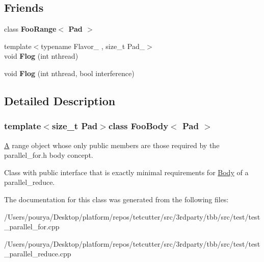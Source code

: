 \subsection*{Friends}
\begin{DoxyCompactItemize}
\item 
\hypertarget{classFooBody_a249f90cfce963ebba6c1d3ef0859364a}{}class {\bfseries Foo\+Range$<$ Pad $>$}\label{classFooBody_a249f90cfce963ebba6c1d3ef0859364a}

\item 
\hypertarget{classFooBody_aa75206a0225a9557bdeaa728d5d5570c}{}{\footnotesize template$<$typename Flavor\+\_\+ , size\+\_\+t Pad\+\_\+$>$ }\\void {\bfseries Flog} (int nthread)\label{classFooBody_aa75206a0225a9557bdeaa728d5d5570c}

\item 
\hypertarget{classFooBody_a44c1e723f2ff326357d193c62f8b7ce0}{}void {\bfseries Flog} (int nthread, bool interference)\label{classFooBody_a44c1e723f2ff326357d193c62f8b7ce0}

\end{DoxyCompactItemize}


\subsection{Detailed Description}
\subsubsection*{template$<$size\+\_\+t Pad$>$class Foo\+Body$<$ Pad $>$}

\hyperlink{structA}{A} range object whose only public members are those required by the parallel\+\_\+for.\+h body concept. 

Class with public interface that is exactly minimal requirements for \hyperlink{classBody}{Body} of a parallel\+\_\+reduce. 

The documentation for this class was generated from the following files\+:\begin{DoxyCompactItemize}
\item 
/\+Users/pourya/\+Desktop/platform/repos/tetcutter/src/3rdparty/tbb/src/test/test\+\_\+parallel\+\_\+for.\+cpp\item 
/\+Users/pourya/\+Desktop/platform/repos/tetcutter/src/3rdparty/tbb/src/test/test\+\_\+parallel\+\_\+reduce.\+cpp\end{DoxyCompactItemize}

